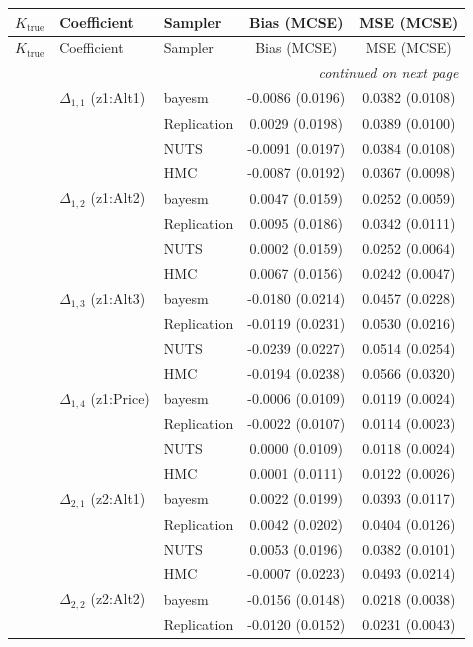 \begin{longtable}{cllcc}
\toprule
$K_{\text{true}}$ & Coefficient & Sampler & Bias (MCSE) & MSE (MCSE) \\
\midrule
\endfirsthead
\toprule
$K_{\text{true}}$ & Coefficient & Sampler & Bias (MCSE) & MSE (MCSE) \\
\midrule
\endhead
\midrule
\multicolumn{5}{r}{\emph{continued on next page}} \\
\endfoot
\bottomrule
\endlastfoot
1 & $\Delta_{1,1}$ (z1:Alt1) & bayesm & -0.0086 (0.0196) & 0.0382 (0.0108) \\
 &  & Replication & 0.0029 (0.0198) & 0.0389 (0.0100) \\
 &  & NUTS & -0.0091 (0.0197) & 0.0384 (0.0108) \\
 &  & HMC & -0.0087 (0.0192) & 0.0367 (0.0098) \\
 & $\Delta_{1,2}$ (z1:Alt2) & bayesm & 0.0047 (0.0159) & 0.0252 (0.0059) \\
 &  & Replication & 0.0095 (0.0186) & 0.0342 (0.0111) \\
 &  & NUTS & 0.0002 (0.0159) & 0.0252 (0.0064) \\
 &  & HMC & 0.0067 (0.0156) & 0.0242 (0.0047) \\
 & $\Delta_{1,3}$ (z1:Alt3) & bayesm & -0.0180 (0.0214) & 0.0457 (0.0228) \\
 &  & Replication & -0.0119 (0.0231) & 0.0530 (0.0216) \\
 &  & NUTS & -0.0239 (0.0227) & 0.0514 (0.0254) \\
 &  & HMC & -0.0194 (0.0238) & 0.0566 (0.0320) \\
 & $\Delta_{1,4}$ (z1:Price) & bayesm & -0.0006 (0.0109) & 0.0119 (0.0024) \\
 &  & Replication & -0.0022 (0.0107) & 0.0114 (0.0023) \\
 &  & NUTS & 0.0000 (0.0109) & 0.0118 (0.0024) \\
 &  & HMC & 0.0001 (0.0111) & 0.0122 (0.0026) \\
 & $\Delta_{2,1}$ (z2:Alt1) & bayesm & 0.0022 (0.0199) & 0.0393 (0.0117) \\
 &  & Replication & 0.0042 (0.0202) & 0.0404 (0.0126) \\
 &  & NUTS & 0.0053 (0.0196) & 0.0382 (0.0101) \\
 &  & HMC & -0.0007 (0.0223) & 0.0493 (0.0214) \\
 & $\Delta_{2,2}$ (z2:Alt2) & bayesm & -0.0156 (0.0148) & 0.0218 (0.0038) \\
 &  & Replication & -0.0120 (0.0152) & 0.0231 (0.0043) \\

\end{longtable}
